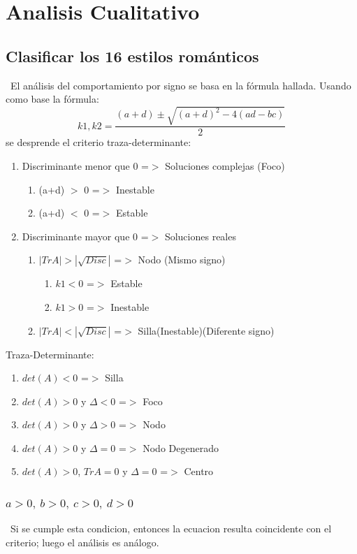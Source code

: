 \documentclass[a4paper, 10pt]{article}
\begin{document}
\section{Analisis Cualitativo}
\subsection{Clasificar los 16 estilos románticos}
\ El análisis del comportamiento por signo se basa en la fórmula hallada.
 Usando como base la fórmula: 
$$ k1,k2 = \frac{(a+d) \pm \sqrt{(a+d)^2 -4(ad - bc)} }{2}$$
se desprende el criterio traza-determinante:
\begin{enumerate}
\item Discriminante menor que 0 =$>$ Soluciones complejas (Foco)
\begin{enumerate}
\item (a+d) $>$ 0 =$>$ Inestable
\item (a+d) $<$ 0 =$>$ Estable
\end{enumerate}
\item Discriminante mayor que 0 =$>$ Soluciones reales
\begin{enumerate}
 \item $|TrA|>|\sqrt{Disc}|$ =$>$ Nodo (Mismo signo)
  \begin{enumerate}
    \item $k1<0$ =$>$ Estable
    \item $k1>0$ =$>$ Inestable
  \end{enumerate}
   \item $|TrA|<|\sqrt{Disc}|$ =$>$ Silla(Inestable)(Diferente signo)
  \end{enumerate}
\end{enumerate}
Traza-Determinante:
\begin{enumerate}
    \item $det(A)<0$ =$>$ Silla
    \item $det(A)>0$ y $\Delta<0$  =$>$ Foco
    \item $det(A)>0$ y $\Delta>0$  =$>$ Nodo
    \item $det(A)>0 $ y $\Delta=0$ =$>$ Nodo Degenerado
    \item $det(A)>0 $, $TrA=0$ y $\Delta=0$ =$>$ Centro
\end{enumerate}

\subsubsection{$a>0,\ b>0,\ c>0,\ d>0$} 
\ Si se cumple esta condicion, entonces la ecuacion resulta coincidente con el criterio; luego el análisis es análogo.
\end{document}
